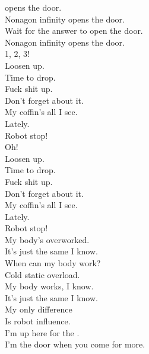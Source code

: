 
\label{album:nonagon-infinity}




 opens the door. \\
Nonagon infinity opens the door. \\
Wait for the answer to open the door. \\
Nonagon infinity opens the door. \\

1, 2, 3! \\

Loosen up. \\
Time to drop. \\
Fuck shit up. \\
Don't forget about it. \\
My coffin's all I see. \\
Lately. \\
Robot stop! \\

Oh! \\

Loosen up. \\
Time to drop. \\
Fuck shit up. \\
Don't forget about it. \\
My coffin's all I see. \\
Lately. \\
Robot stop! \\

My body's overworked. \\
It's just the same I know. \\
When can my body work? \\
Cold static overload. \\
My body works, I know. \\
It's just the same I know. \\
My only difference \\
Is robot influence. \\

I'm up here for the . \\
I'm the door when you come for more. \\

